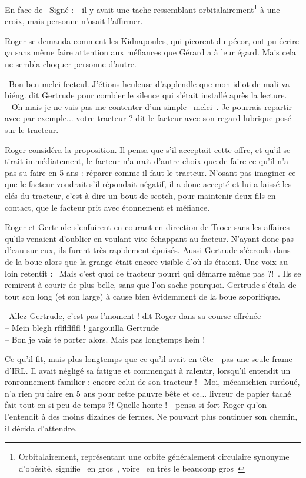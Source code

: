 \documentclass[a5paper, 10pt, twoside]{book}
\newcommand{\cg}{\guillemotleft~}
\newcommand{\cd}{~\guillemotright}
\begin{document}
En face de \cg Signé :\cd\ il y avait une tache ressemblant orbitalairement\footnote{Orbitalairement, représentant une orbite généralement circulaire synonyme d'obésité, signifie \cg en gros\cd, voire \cg en très le beaucoup gros\cd} à une croix, mais personne n'osait l'affirmer.

Roger se demanda comment les Kidnapoules, qui picorent du pécor, ont pu écrire ça sans même faire attention aux méfiances que Gérard a à leur égard. Mais cela ne sembla choquer personne d'autre.

\cg Bon ben melci fecteul. J'étions heuleuse d'applendle que mon idiot de mali va biéng. dit Gertrude pour combler le silence qui s'était installé après la lecture.\\
-- Oh mais je ne vais pas me contenter d'un simple \cg melci\cd. Je pourrais repartir avec par exemple... votre tracteur ? dit le facteur avec son regard lubrique posé sur le tracteur.\cd

Roger considéra la proposition. Il pensa que s'il acceptait cette offre, et qu'il se tirait immédiatement, le facteur n'aurait d'autre choix que de faire ce qu'il n'a pas su faire en 5 ans : réparer comme il faut le tracteur. N'osant pas imaginer ce que le facteur voudrait s'il répondait négatif, il a donc accepté et lui a laissé les clés du tracteur, c'est à dire un bout de scotch, pour maintenir deux fils en contact, que le facteur prit avec étonnement et méfiance.

Roger et Gertrude s'enfuirent en courant en direction de Troce sans les affaires qu'ils venaient d'oublier en voulant vite échappant au facteur. N'ayant donc pas d'eau sur eux, ils furent très rapidement épuisés. Aussi Gertrude s'écroula dans de la boue alors que la grange était encore visible d'où ils étaient. Une voix au loin retentit : \cg Mais c'est quoi ce tracteur pourri qui démarre même pas ?!\cd. Ils se remirent à courir de plus belle, sans que l'on %
sache pourquoi. Gertrude s'étala de tout son long (et son large) à cause bien évidemment de la boue soporifique.

\cg Allez Gertrude, c'est pas l'moment ! dit Roger dans sa course effrénée\\
-- Mein blegh rflflflflfl ! gargouilla Gertrude\\
-- Bon je vais te porter alors. Mais pas longtemps hein !\cd

Ce qu'il fit, mais plus longtemps que ce qu'il avait en tête - pas une seule frame d'IRL. Il avait négligé sa fatigue et commençait à ralentir, lorsqu'il entendit un ronronnement familier : encore celui de son tracteur ! \cg Moi, mécanichien surdoué, n'a rien pu faire en 5 ans pour cette pauvre bête et ce... livreur de papier taché fait tout en si peu de temps ?! Quelle honte !\cd\ pensa si fort Roger qu'on l'entendit à des moins dizaines de fermes. Ne pouvant plus continuer son chemin, il décida d'attendre.
\end{document}
